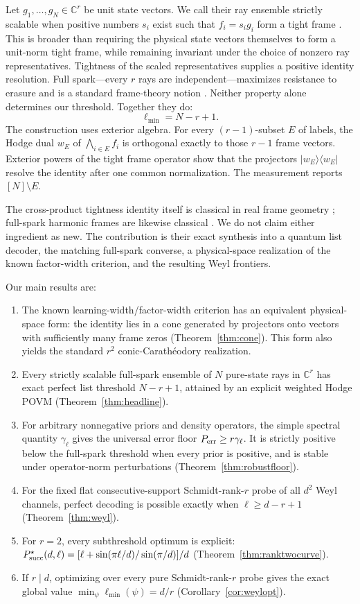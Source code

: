 \documentclass[11pt,a4paper]{article}
\newcommand{\C}{\mathbb{C}}
\newcommand{\ket}[1]{\lvert #1\rangle}
\newcommand{\bra}[1]{\langle #1\rvert}
\newcommand{\proj}[1]{\ket{#1}\!\bra{#1}}
\begin{document}
Let $g_1,\ldots,g_N\in\C^r$ be unit state vectors.  We call their ray
ensemble strictly scalable when positive numbers $s_i$ exist such that
$f_i=s_i g_i$ form a tight frame \cite{KutyniokEtAl2013}.  This is broader than requiring the
physical state vectors themselves to form a unit-norm tight frame, while
remaining invariant under the choice of nonzero ray representatives.
Tightness of the scaled representatives supplies a positive identity
resolution.  Full spark---every $r$ rays are independent---maximizes
resistance to erasure and is a standard frame-theory notion
\cite{AlexeevCahillMixon2012,CasazzaKutyniok2013}.  Neither property
alone determines our threshold.  Together they do:
\[
  \boxed{\ell_{\min}=N-r+1.}
\]
The construction uses exterior algebra.  For every $(r-1)$-subset $E$ of
labels, the Hodge dual $w_E$ of $\bigwedge_{i\in E}f_i$ is orthogonal exactly
to those $r-1$ frame vectors.  Exterior powers of the tight frame operator
show that the projectors $\proj{w_E}$ resolve the identity after one common
normalization.  The measurement reports $[N]\setminus E$.

The cross-product tightness identity itself is classical in real frame
geometry \cite{Ivanov2021}; full-spark harmonic frames are likewise classical
\cite{AlexeevCahillMixon2012}.  We do not claim either ingredient as new.  The
contribution is their exact synthesis into a quantum list decoder, the matching
full-spark converse, a physical-space realization of the known factor-width
criterion, and the resulting Weyl frontiers.

Our main results are:
\begin{enumerate}[leftmargin=2em]
\item The known learning-width/factor-width criterion has an equivalent
physical-space form: the identity lies in a cone generated by projectors onto
vectors with sufficiently many frame zeros (Theorem~\ref{thm:cone}).  This
form also yields the standard $r^2$ conic-Carath\'eodory realization.
\item Every strictly scalable full-spark ensemble of $N$ pure-state rays in
$\C^r$ has exact perfect list threshold $N-r+1$, attained by an explicit
weighted Hodge POVM
(Theorem~\ref{thm:headline}).
\item For arbitrary nonnegative priors and density operators, the simple
spectral quantity $\gamma_\ell$ gives the universal error floor
$P_{\rm err}\ge r\gamma_\ell$.  It is strictly positive below the full-spark
threshold when every prior is positive, and is stable under operator-norm
perturbations
(Theorem~\ref{thm:robustfloor}).
\item For the fixed flat consecutive-support Schmidt-rank-$r$ probe of all
$d^2$ Weyl channels, perfect decoding is possible exactly when
$\ell\ge d-r+1$
(Theorem~\ref{thm:weyl}).
\item For $r=2$, every subthreshold optimum is explicit:
$P_{\rm succ}^{\star}(d,\ell)=
[\ell+\sin(\pi\ell/d)/\sin(\pi/d)]/d$
(Theorem~\ref{thm:ranktwocurve}).
\item If $r\mid d$, optimizing over every pure Schmidt-rank-$r$ probe gives
the exact global value $\min_\psi\ell_{\min}(\psi)=d/r$
(Corollary~\ref{cor:weylopt}).
\end{enumerate}
\end{document}
